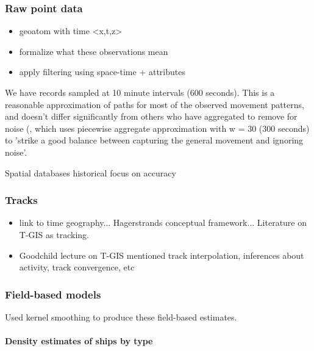 
\subsubsection{Raw point data}
 \begin{itemize}
   \item geoatom with time <x,t,z>
   \item formalize what these observations mean
   \item apply filtering using space-time + attributes
 \end{itemize}

We have records sampled at 10 minute intervals (600 seconds). This is a reasonable approximation of paths for most of the observed movement patterns, and doesn't differ significantly from others who have aggregated to remove for noise (\cite{Vries2009}, which uses piecewise aggregate approximation with w = 30 (300 seconds) to 'strike a good balance between capturing the general movement and ignoring noise'. %

Spatial databases historical focus on accuracy \citep{goodchild1989accuracy}

\subsubsection{Tracks}
 \begin{itemize}
   \item link to time geography... Hagerstrands conceptual framework... Literature on T-GIS as tracking.
   \item Goodchild lecture on T-GIS mentioned track interpolation, inferences about activity, track convergence, etc

 \end{itemize}

\subsubsection{Field-based models}

Used kernel smoothing to produce these field-based estimates.

\paragraph{Density estimates of ships by type}

